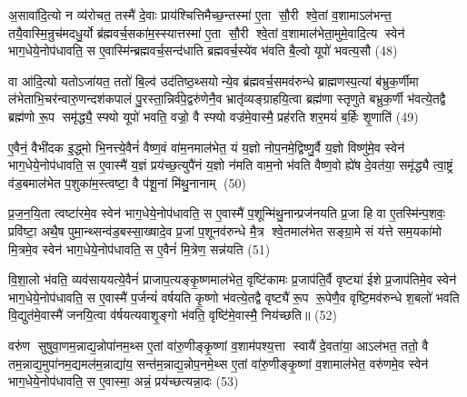 {\anuvakamend[{अ॒भि खलु॒ वृष्टि॒श्छन्द॑सामे॒व रसे॑न प्र॒जामव॑ वैश्वदे॒वा वै ब्र॑ह्मवर्च॒सं यूप॒ एका॒न्नविꣳ॑श॒तिश्च॑। (7)।}]}

अ॒सावा॑दि॒त्यो न व्य॑रोचत॒ तस्मै॑ दे॒वाः प्राय॑श्चित्तिमैच्छ॒न्तस्मा॑ ए॒ता सौ॒री श्वे॒तां व॒शामाऽल॑भन्त॒ तयै॒वास्मि॒न्रुच॑मदधु॒र्यो ब्र॑ह्मवर्च॒सका॑म॒स्स्यात्तस्मा॑ ए॒ता सौ॒री श्वे॒तां व॒शामाल॑भेता॒मुमे॒वादि॒त्य स्वेन॑ भाग॒धेये॒नोप॑धावति॒ स ए॒वास्मि॑न्ब्रह्मवर्च॒सन्द॑धाति ब्रह्मवर्च॒स्ये॑व भ॑वति बै॒ल्\mbox{}वो यूपो॑ भवत्य॒सौ (48)

वा आ॑दि॒त्यो यतोऽजा॑यत॒ ततो॑ बि॒ल्व॑ उद॑तिष्ठ॒थ्सयोन्ये॒व ब्र॑ह्मवर्च॒समव॑रुन्धे ब्राह्मणस्प॒त्यां ब॑भ्रुक॒र्णीमा ल॑भेताभि॒चर॑न्वारु॒णन्दश॑कपालं पु॒रस्ता॒न्निर्व॑पे॒द्वरु॑णेनै॒व भ्रातृ॑व्यङ्ग्राहयि॒त्वा ब्रह्म॑णा स्तृणुते बभ्रुक॒र्णी भ॑वत्ये॒तद्वै ब्रह्म॑णो रू॒प समृ॑द्ध्यै॒ स्फ्यो यूपो॑ भवति॒ वज्रो॒ वै स्फ्यो वज्र॑मे॒वास्मै॒ प्रह॑रति शर॒मयं॑ ब॒र्\mbox{}हिः शृ॒णाति॑ (49)

ए॒वैनं॒ वैभी॑दक इ॒द्ध्मो भि॒नत्त्ये॒वैनं॑ वैष्ण॒वं वा॑म॒नमाल॑भेत॒ यं य॒ज्ञो नोप॒नमे॒द्विष्णु॒र्वै य॒ज्ञो विष्णु॑मे॒व स्वेन॑ भाग॒धेये॒नोप॑धावति॒ स ए॒वास्मै॑ य॒ज्ञं प्रय॑च्छ॒त्युपै॑नं य॒ज्ञो न॑मति वाम॒नो भ॑वति वैष्ण॒वो ह्ये॑ष दे॒वत॑या॒ समृ॑द्ध्यै त्वा॒ष्ट्रं व॑ड॒बमाल॑भेत प॒शुका॑म॒स्त्वष्टा॒ वै प॑शू॒नां मि॑थु॒नानाम् (50)

प्र॒ज॒न॒यि॒ता त्वष्टा॑रमे॒व स्वेन॑ भाग॒धेये॒नोप॑धावति॒ स ए॒वास्मै॑ प॒शून्मि॑थु॒नान्प्रज॑नयति प्र॒जा हि वा ए॒तस्मि॑न्प॒शवः॒ प्रवि॑ष्टा॒ अथै॒ष पुमा॒न्थ्सन्व॑ड॒बस्सा॒ख्षादे॒व प्र॒जां प॒शूनव॑रुन्धे मै॒त्र श्वे॒तमाल॑भेत सङ्ग्रा॒मे सं य॑त्ते सम॒यका॑मो मि॒त्रमे॒व स्वेन॑ भाग॒धेये॒नोप॑धावति॒ स ए॒वैनं॑ मि॒त्रेण॒ सन्न॑यति (51)

वि॒शा॒लो भ॑वति॒ व्यव॑साययत्ये॒वैनं॑ प्राजाप॒त्यङ्कृ॒ष्णमाल॑भेत॒ वृष्टि॑कामः प्र॒जाप॑ति॒र्वै वृष्ट्या॑ ईशे प्र॒जाप॑तिमे॒व स्वेन॑ भाग॒धेये॒नोप॑धावति॒ स ए॒वास्मै॑ प॒र्जन्यं॑ वर्\mbox{}षयति कृ॒ष्णो भ॑वत्ये॒तद्वै वृष्ट्यै॑ रू॒प रू॒पेणै॒व वृष्टि॒मव॑रुन्धे श॒बलो॑ भवति वि॒द्युत॑मे॒वास्मै॑ जनयि॒त्वा व॑र्\mbox{}षयत्यवाशृ॒ङ्गो भ॑वति॒ वृष्टि॑मे॒वास्मै॒ निय॑च्छति॥ (52)

{\anuvakamend{श़ृ॒णाति॑ मिथु॒नानान्नयति यच्छति॥\scriptsize  (8)]}}

वरु॑ण सुषुवा॒णम॒न्नाद्य॒न्नोपा॑नम॒थ्स ए॒तां वा॑रु॒णीङ्कृ॒ष्णां व॒शाम॑पश्य॒त्ता स्वायै॑ दे॒वता॑या॒ आऽल॑भत॒ ततो॒ वै तम॒न्नाद्य॒मुपा॑नम॒द्यमल॑म॒न्नाद्या॑य॒ सन्त॑म॒न्नाद्य॒न्नोप॒नमे॒थ्स ए॒तां वा॑रु॒णीङ्कृ॒ष्णां व॒शामाल॑भेत॒ वरु॑णमे॒व स्वेन॑ भाग॒धेये॒नोप॑धावति॒ स ए॒वास्मा॒ अन्नं॒ प्रय॑च्छत्यन्ना॒दः (53)

